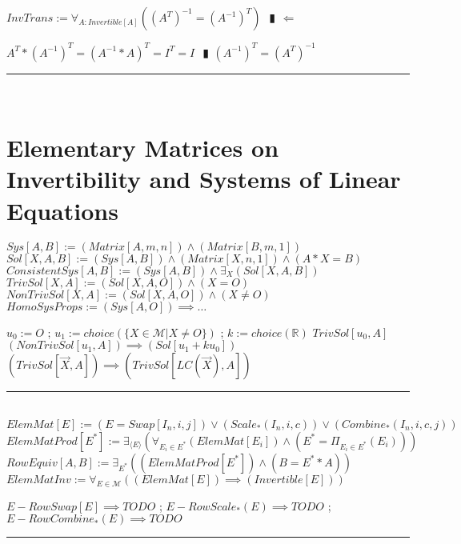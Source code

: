 \documentclass{book}
\newcommand{\abr}{:=}
\newcommand{\pipe}{$\phantom{(}\vrectangleblack\phantom{)}$}
\newcommand{\pr}[1]{\left(#1\right)}
\begin{document}
$InvTrans \abr \forall_{A : Invertible[A]}\pr{(A^T)^{-1} = (A^{-1})^T}$ \pipe $\Leftarrow$
\begin{enumerate}
  \lit $A^T * (A^{-1})^T = (A^{-1} * A)^T = I^T = I$ \pipe $(A^{-1})^T = (A^T)^{-1}$
\end{enumerate} \vspace{.75mm} \hrule \vspace{.75mm} \ \\ 


\section{Elementary Matrices on Invertibility and Systems of Linear Equations}
$Sys[A, B] \abr (Matrix[A, m, n]) \land (Matrix[B, m, 1])$ \\
$Sol[X, A, B] \abr (Sys[A, B]) \land (Matrix[X, n, 1]) \land (A * X = B)$ \\
$ConsistentSys[A, B] \abr (Sys[A, B]) \land \exists_{X}(Sol[X, A, B])$ \\
$TrivSol[X, A] \abr (Sol[X, A, O]) \land (X = O)$ \\
$NonTrivSol[X, A] \abr (Sol[X, A, O]) \land (X \neq O)$ \\

$HomoSysProps \abr (Sys[A, O]) \implies \ldots$
\begin{enumerate}
  \lit $u_0 \abr O$ ; $u_1 \abr choice(\{X \in \mathcal{M} | X \neq O\})$ ; $k \abr choice(\mathbb{R})$
  \lit $TrivSol[u_0, A]$
  \lit $(NonTrivSol[u_1, A]) \implies (Sol[u_1 + k u_0])$
  \lit $(TrivSol[\overrightarrow{X}, A]) \implies \pr{TrivSol[LC(\overrightarrow{X}), A]}$
\end{enumerate} \vspace{.75mm} \hrule \vspace{.75mm} \ \\ 

$ElemMat[E] \abr (E = Swap[I_n, i, j]) \lor \pr{Scale_*(I_n, i, c)} \lor \pr{Combine_*(I_n, i, c, j)}$ \\
$ElemMatProd[E^*] \abr \exists_{\langle E \rangle}\pr{\forall_{E_i \in E^*}(ElemMat[E_i]) \land \pr{E^* = \Pi_{E_i \in E^*}(E_i)}}$ \\
$RowEquiv[A, B] \abr \exists_{E^*}\pr{(ElemMatProd[E^*]) \land (B = E^* * A)}$ \\

$ElemMatInv \abr \forall_{E \in \mathcal{M}}\pr{(ElemMat[E]) \implies (Invertible[E])}$
\begin{enumerate}
  \lit $E-RowSwap[E] \implies TODO$ ; $E-RowScale_*(E) \implies TODO$ ; $E-RowCombine_*(E) \implies TODO$
\end{enumerate} \vspace{.75mm} \hrule \vspace{.75mm} \ \\ 
\end{document}

